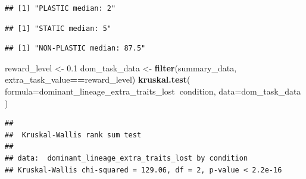 \documentclass[]{book}
\newenvironment{Shaded}{\begin{snugshade}}{\end{snugshade}}
\newcommand{\DataTypeTok}[1]{\textcolor[rgb]{0.13,0.29,0.53}{#1}}
\newcommand{\FloatTok}[1]{\textcolor[rgb]{0.00,0.00,0.81}{#1}}
\newcommand{\KeywordTok}[1]{\textcolor[rgb]{0.13,0.29,0.53}{\textbf{#1}}}
\newcommand{\NormalTok}[1]{#1}
\newcommand{\OperatorTok}[1]{\textcolor[rgb]{0.81,0.36,0.00}{\textbf{#1}}}
\newcommand{\StringTok}[1]{\textcolor[rgb]{0.31,0.60,0.02}{#1}}
\begin{document}
\begin{verbatim}
## [1] "PLASTIC median: 2"
\end{verbatim}

\begin{Shaded}
\end{Shaded}

\begin{verbatim}
## [1] "STATIC median: 5"
\end{verbatim}

\begin{Shaded}
\end{Shaded}

\begin{verbatim}
## [1] "NON-PLASTIC median: 87.5"
\end{verbatim}

\begin{Shaded}
\begin{Highlighting}[]
\NormalTok{reward_level <-}\StringTok{ }\FloatTok{0.1}
\NormalTok{dom_task_data <-}\StringTok{ }\KeywordTok{filter}\NormalTok{(summary_data, extra_task_value}\OperatorTok{==}\NormalTok{reward_level)}
\KeywordTok{kruskal.test}\NormalTok{(}
  \DataTypeTok{formula=}\NormalTok{dominant_lineage_extra_traits_lost}\OperatorTok{~}\NormalTok{condition,}
  \DataTypeTok{data=}\NormalTok{dom_task_data}
\NormalTok{)}
\end{Highlighting}
\end{Shaded}

\begin{verbatim}
## 
##  Kruskal-Wallis rank sum test
## 
## data:  dominant_lineage_extra_traits_lost by condition
## Kruskal-Wallis chi-squared = 129.06, df = 2, p-value < 2.2e-16
\end{verbatim}
\end{document}
